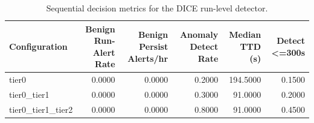 \begin{table}[t]
\centering
\caption{Sequential decision metrics for the DICE run-level detector.}
\label{tab:dice_sequential_metrics}
\footnotesize
\begin{tabular}{lrrrrr}
\toprule
Configuration & Benign Run-Alert Rate & Benign Persist Alerts/hr & Anomaly Detect Rate & Median TTD (s) & Detect <=300s \\
\midrule
tier0 & 0.0000 & 0.0000 & 0.2000 & 194.5000 & 0.1500 \\
tier0_tier1 & 0.0000 & 0.0000 & 0.3000 & 91.0000 & 0.2000 \\
tier0_tier1_tier2 & 0.0000 & 0.0000 & 0.8000 & 91.0000 & 0.4500 \\
\bottomrule
\end{tabular}

\end{table}
